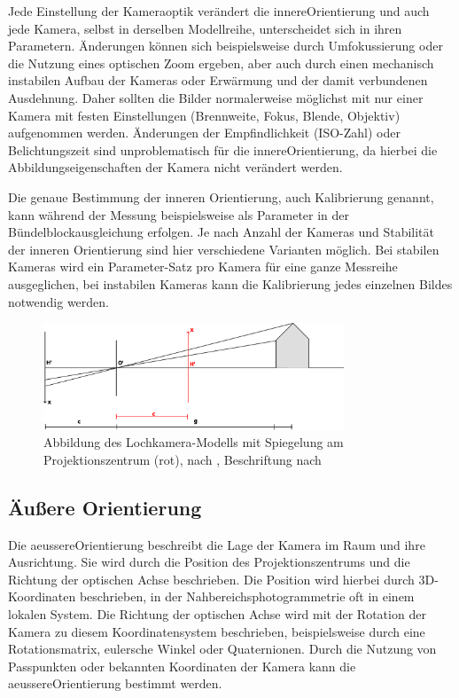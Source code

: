 \documentclass[./00PhotoBox.tex]{subfiles}
\begin{document}
Jede Einstellung der Kameraoptik verändert die \gls{innereOrientierung} und auch jede Kamera, selbst in derselben Modellreihe, unterscheidet sich in ihren Parametern. Änderungen können sich beispielsweise durch Umfokussierung oder die Nutzung eines optischen Zoom ergeben, aber auch durch einen mechanisch instabilen Aufbau der Kameras oder Erwärmung und der damit verbundenen Ausdehnung. Daher sollten die Bilder normalerweise möglichst mit nur einer Kamera mit festen Einstellungen (Brennweite, Fokus, Blende, Objektiv) aufgenommen werden. Änderungen der Empfindlichkeit (ISO-Zahl) oder Belichtungszeit sind unproblematisch für die \gls{innereOrientierung}, da hierbei die Abbildungseigenschaften der Kamera nicht verändert werden. \citep[vgl.][S. 176]{luhmann}

Die genaue Bestimmung der inneren Orientierung, auch Kalibrierung genannt, kann wäh\-rend der Messung beispielsweise als Parameter in der Bündel\-block\-ausgleichung erfolgen. Je nach Anzahl der Kameras und Stabilität der inneren Orientierung sind hier verschiedene Varianten möglich. Bei stabilen Kameras wird ein Parameter-Satz pro Kamera für eine ganze Messreihe ausgeglichen, bei instabilen Kameras kann die Kalibrierung jedes einzelnen Bildes notwendig werden. \citep[vgl.][S. 181f]{luhmann}

\begin{figure}
    \centering
    \includegraphics[width=0.8\textwidth]{./img/2_grundlagen/optischeAchse.pdf}
    \caption{Abbildung des Lochkamera-Modells mit Spiegelung am Projektionszentrum (rot), nach \citet[S. 154]{hartley}, Beschriftung nach \citet[S. 177]{luhmann}}
    \label{img:optische_achse}
\end{figure}


\subsection{Äußere Orientierung}
\label{s:aeussereorientierung}
Die \gls{aeussereOrientierung} beschreibt die Lage der Kamera im Raum und ihre Ausrichtung. Sie wird durch die Position des Projektionszentrums und die Richtung der optischen Achse beschrieben. Die Position wird hierbei durch 3D-Koordinaten beschrieben, in der Nahbereichsphotogrammetrie oft in einem lokalen System. Die Richtung der optischen Achse wird mit der Rotation der Kamera zu diesem Koordinatensystem beschrieben, beispielsweise durch eine Rotationsmatrix, eulersche Winkel oder Quaternionen. Durch die Nutzung von Passpunkten oder bekannten Koordinaten der Kamera kann die \gls{aeussereOrientierung} bestimmt werden. \citep[vgl.][S. 273ff]{luhmann}
\end{document}
